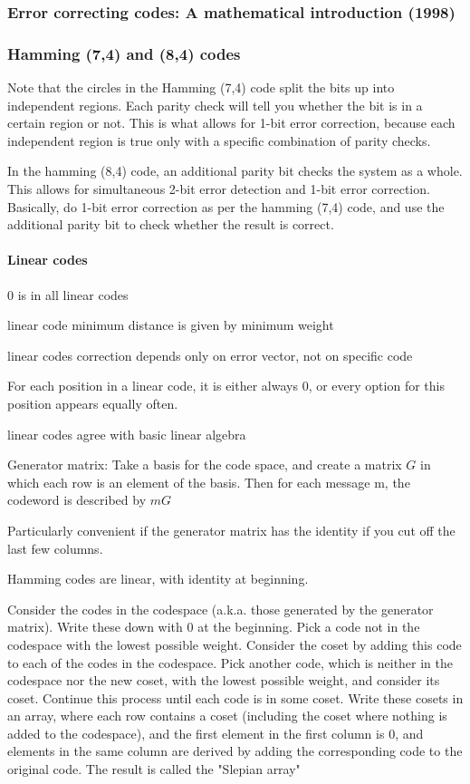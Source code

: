 \documentclass{article}
\begin{document}
\subsubsection{Error correcting codes: A  mathematical introduction (1998)}

\subsubsection{Hamming (7,4) and (8,4) codes}

Note that the circles in the Hamming (7,4) code split the bits up into independent regions. Each parity check will tell you whether the bit is in a certain region or not. This is what allows for 1-bit error correction, because each independent region is true only with a specific combination of parity checks.

In the hamming (8,4) code, an additional parity bit checks the system as a whole. This allows for simultaneous 2-bit error detection and 1-bit error correction. Basically, do 1-bit error correction as per the hamming (7,4) code, and use the additional parity bit to check whether the result is correct.

\paragraph{Linear codes}

0 is in all linear codes

linear code minimum distance is given by minimum weight

linear codes correction depends only on error vector, not on  specific code

For each position in a linear code, it is either always 0, or every option for this position appears equally often.

linear codes agree with basic linear algebra

Generator matrix: Take a basis for the code space, and create a matrix $G$ in which each row is an element of the basis. Then for each message m, the codeword is described by $m G$

Particularly convenient if the generator matrix has the identity if you cut off the last few columns.

Hamming codes are linear, with identity at beginning.

Consider the codes in the codespace (a.k.a. those generated by the generator matrix). Write these down with 0 at the beginning. Pick a code not in the codespace with the lowest possible weight. Consider the coset by adding this code to each of the codes in the codespace. Pick another code, which is neither in the codespace nor the new coset, with the lowest possible weight, and consider its coset. Continue this process until each code is in some coset. Write these cosets in an array, where each row contains a coset (including the coset where nothing is added to the codespace), and the first element in the first column is 0, and elements in the same column are derived by adding the corresponding code to the original code. The result is called the "Slepian array"
\end{document}
